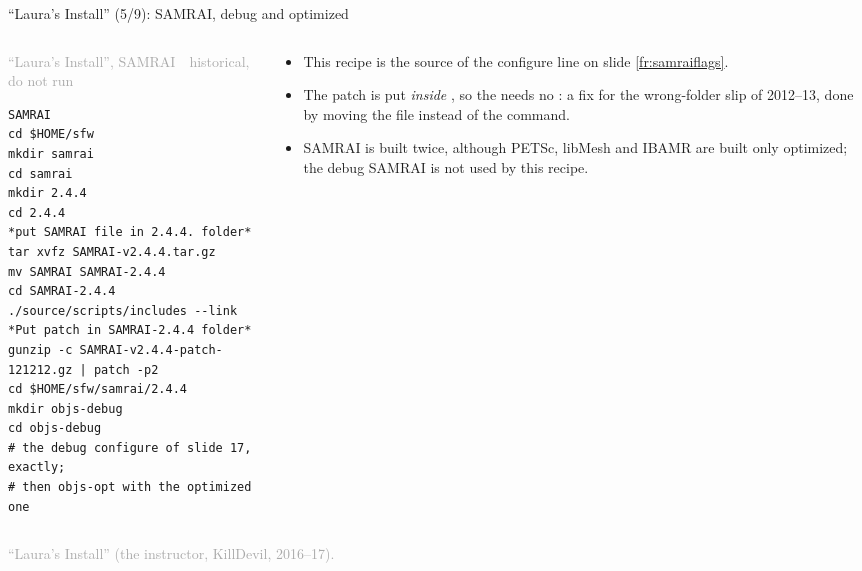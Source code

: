 \documentclass[aspectratio=169,11pt]{beamer}
\newcommand{\sourcecredit}[1]{\vfill\begin{flushright}\tiny\textcolor{DarkGray}{#1}\end{flushright}}
\newcommand{\hist}[1]{{\tiny\sffamily\textcolor{DarkGray}{#1\ \textbullet\ historical, do not run}}\par\nointerlineskip\vspace{0.3mm}}
\begin{document}
\begin{frame}[fragile]{``Laura's Install'' (5/9): SAMRAI, debug and optimized}
\label{fr:li4}
\begin{columns}[T,onlytextwidth]
\begin{column}{0.5\textwidth}
\hist{``Laura's Install'', SAMRAI}
\begin{lstlisting}[style=hist]
SAMRAI
cd $HOME/sfw
mkdir samrai
cd samrai
mkdir 2.4.4
cd 2.4.4
*put SAMRAI file in 2.4.4. folder*
tar xvfz SAMRAI-v2.4.4.tar.gz
mv SAMRAI SAMRAI-2.4.4
cd SAMRAI-2.4.4
./source/scripts/includes --link
*Put patch in SAMRAI-2.4.4 folder*
gunzip -c SAMRAI-v2.4.4-patch-121212.gz | patch -p2
cd $HOME/sfw/samrai/2.4.4
mkdir objs-debug
cd objs-debug
# the debug configure of slide 17, exactly;
# then objs-opt with the optimized one
\end{lstlisting}
\end{column}
\begin{column}{0.47\textwidth}
\footnotesize
\begin{itemize}\setlength{\itemsep}{2pt}
  \item This recipe is the source of the configure line on slide \ref{fr:samraiflags}.
  \item The patch is put \emph{inside} , so the  needs no : a fix for the wrong-folder slip of 2012--13, done by moving the file instead of the command.
  \item SAMRAI is built twice, although PETSc, libMesh and IBAMR are built only optimized; the debug SAMRAI is not used by this recipe.
\end{itemize}
\end{column}
\end{columns}
\sourcecredit{``Laura's Install'' (the instructor, KillDevil, 2016--17).}
\end{frame}
\end{document}
